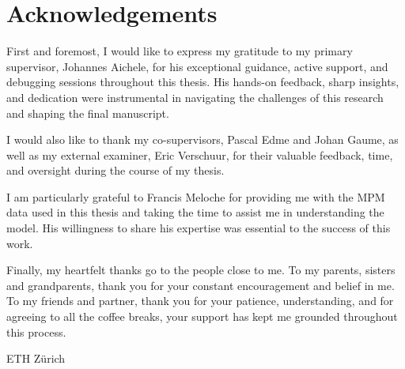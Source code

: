 \chapter*{Acknowledgements}


First and foremost, I would like to express my gratitude to my primary supervisor, Johannes Aichele, for his exceptional guidance, active support, and debugging sessions throughout this thesis. His hands-on feedback, sharp insights, and dedication were instrumental in navigating the challenges of this research and shaping the final manuscript. \par 

I would also like to thank my co-supervisors, Pascal Edme and Johan Gaume, as well as my external examiner, Eric Verschuur, for their valuable feedback, time, and oversight during the course of my thesis. \par 

I am particularly grateful to Francis Meloche for providing me with the MPM data used in this thesis and taking the time to assist me in understanding the model. His willingness to share his expertise was essential to the success of this work. \par 

Finally, my heartfelt thanks go to the people close to me. To my parents, sisters and grandparents, thank you for your constant encouragement and belief in me. To my friends and partner, thank you for your patience, understanding, and for agreeing to all the coffee breaks, your support has kept me grounded throughout this process. \par 

\vspace{15mm}
\noindent
ETH Zürich \hfill \myauthor\\
\mydate

\cleardoublepage
